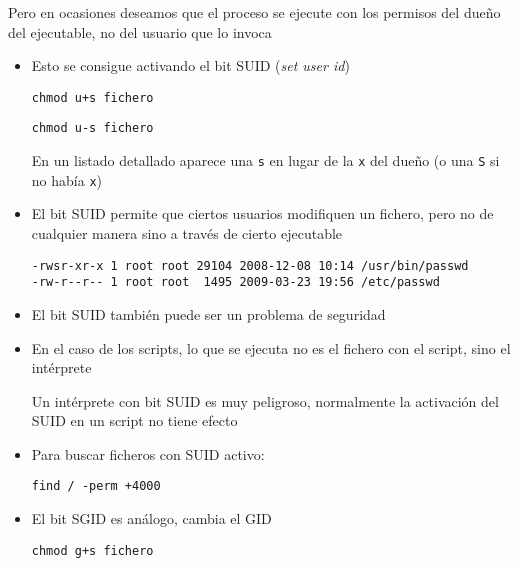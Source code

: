 \documentclass[ucs]{beamer}
\begin{document}
\begin{frame}[fragile]
Pero en ocasiones deseamos que el proceso se ejecute con los
permisos del dueño
del ejecutable, no del usuario que lo invoca
\begin{itemize}
\item
Esto se consigue activando el bit SUID  (\emph{set user id})

\verb|chmod u+s fichero|

\verb|chmod u-s fichero|

En un listado detallado aparece una \verb|s| en lugar de la \verb|x| del
dueño (o una \verb|S| si no había \verb|x|)
\item
El bit SUID permite que ciertos usuarios modifiquen un fichero, pero
no de cualquier manera sino a través de cierto ejecutable

  \begin{footnotesize}
  \begin{verbatim}
-rwsr-xr-x 1 root root 29104 2008-12-08 10:14 /usr/bin/passwd
-rw-r--r-- 1 root root  1495 2009-03-23 19:56 /etc/passwd
  \end{verbatim}
  \end{footnotesize}

\end{itemize}
\end{frame}
\begin{frame}[fragile]
\begin{itemize}
\item
El bit SUID también puede ser un problema de seguridad

\item
En el caso de los scripts, lo que se ejecuta no es
el fichero con el script, sino el intérprete

Un intérprete con bit SUID es muy peligroso, normalmente
la activación del SUID en un script no tiene efecto

\item
Para buscar ficheros con SUID activo:

\verb|find / -perm +4000|

\item
El bit SGID es análogo, cambia el GID

\verb|chmod g+s fichero|

\end{itemize}

\end{frame}
\end{document}
